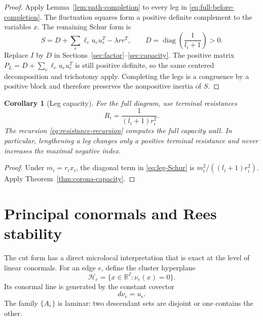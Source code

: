 \documentclass[11pt,a4paper]{amsart}
\theoremstyle{plain}
\newtheorem{corollary}[theorem]{Corollary}
\theoremstyle{definition}
\newcommand{\RR}{\mathbb R}
\newcommand{\diag}{\operatorname{diag}}
\newcommand{\Hcal}{\mathcal H}
\begin{document}
\begin{proof}
Apply Lemma~\ref{lem:path-completion} to every leg in
\eqref{eq:full-before-completion}.  The fluctuation squares form a positive definite complement
to the variables $x$.  The remaining Schur form is
\begin{equation}\label{eq:leg-Schur}
 S=D+\sum_e\ell_eu_eu_e^T-\lambda rr^T,\qquad
 D=\diag\left(\frac1{l_i+1}\right)>0.
\end{equation}
Replace $I$ by $D$ in Sections~\ref{sec:factor}--\ref{sec:capacity}.  The positive matrix
$P_L=D+\sum_e\ell_eu_eu_e^T$ is still positive definite, so the same centered decomposition and
trichotomy apply.  Completing the legs is a congruence by a positive block and therefore preserves
the nonpositive inertia of $S$.
\end{proof}

\begin{corollary}[Leg capacity]\label{cor:leg-capacity}
For the full diagram, use terminal resistances
\begin{equation}\label{eq:leg-resistance}
                         R_i=\frac{1}{(l_i+1)r_i^2}.
\end{equation}
The recursion \eqref{eq:resistance-recursion} computes the full capacity wall.  In particular,
lengthening a leg changes only a positive terminal resistance and never increases the maximal
negative index.
\end{corollary}

\begin{proof}
Under $m_i=r_ix_i$, the diagonal term in \eqref{eq:leg-Schur} is
$m_i^2/((l_i+1)r_i^2)$.  Apply Theorem~\ref{thm:corona-capacity}.
\end{proof}

\section{Principal conormals and Rees stability}\label{sec:conormal}

The cut form has a direct microlocal interpretation that is exact at the level of linear
conormals.  For an edge $e$, define the cluster hyperplane
\begin{equation}\label{eq:cluster-hyperplane}
             \Hcal_e=\{x\in\RR^I:\nu_e(x)=0\}.
\end{equation}
Its conormal line is generated by the constant covector
\begin{equation}\label{eq:principal-conormal}
                         d\nu_e=u_e.
\end{equation}
The family $\{A_e\}$ is laminar: two descendant sets are disjoint or one contains the other.
\end{document}
